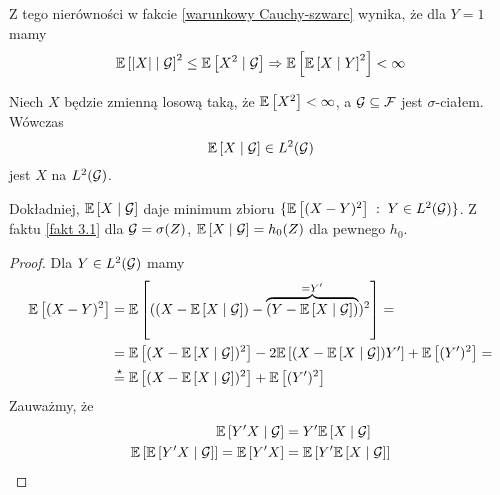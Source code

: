 Z tego nierówności w fakcie \ref{warunkowy Cauchy-szwarc} wynika, że dla $Y=1$ mamy
$$\expected{|X|}{\set{G}}^2\leq\expected{X^2}{\set{G}}\implies\expected{\expected{X}{Y}^2}<\infty$$

\begin{theorem}
  Niech $X$ będzie zmienną losową taką, że $\expected{X^2}<\infty$, a $\mathcal{G}\subseteq\mathcal{F}$ jest $\sigma$-ciałem. Wówczas 
  $$\expected{X}{\set{G}}\in L^2(\set{G})$$
  jest  $X$ na $L^2(\mathcal{G})$.
\end{theorem}

\begin{center}\end{center}

Dokładniej, $\expected{X}{\set{G}}$ daje minimum zbioru $\{\expected{(X-Y)^2}\;:\;Y\in L^2(\set{G})\}$. Z faktu \ref{fakt 3.1} dla $\mathcal{G}=\sigma(Z)$, $\expected{X}{\set{G}}=h_0(Z)$ dla pewnego $h_0$.

\begin{proof}
  Dla $Y\in L^2(\mathcal{G})$ mamy 
  \begin{align*}
    \expected{(X-Y)^2}&=\expected{((X-\expected{X}{\set{G}})-\overbrace{(Y-\expected{X}{\set{G}})}^{=Y'})^2}=\\
                      &=\expected{(X-\expected{X}{\set{G}})^2}-2\expected{(X-\expected{X}{\set{G}})Y'}+\expected{(Y')^2}=\\
                      &\overset{\star}{=}\expected{(X-\expected{X}{\set{G}})^2}+\expected{(Y')^2}
  \end{align*}
  Zauważmy, że
  \begin{align*}\expected{Y'X}{\set{G}}&=Y'\expected{X}{\set{G}}\\
    \expected{\expected{Y'X}{\set{G}}}=\expected{Y'X}&=\expected{Y'\expected{X}{\set{G}}}
\end{align*}
\end{proof}

